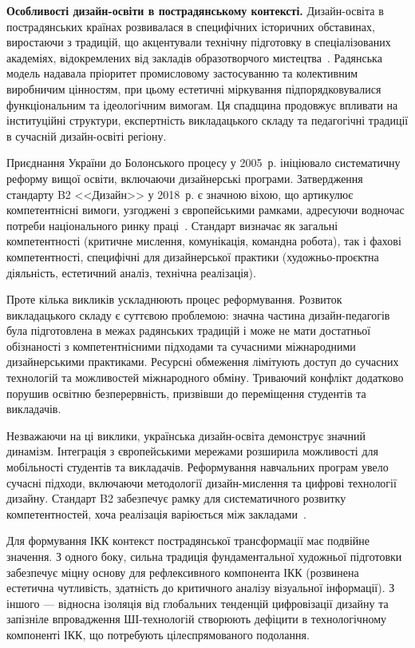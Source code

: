 \textbf{Особливості дизайн-освіти в пострадянському контексті.} Дизайн-освіта в пострадянських країнах розвивалася в специфічних історичних обставинах, виростаючи з традицій, що акцентували технічну підготовку в спеціалізованих академіях, відокремлених від закладів образотворчого мистецтва~\cite{Fursa2014}. Радянська модель надавала пріоритет промисловому застосуванню та колективним виробничим цінностям, при цьому естетичні міркування підпорядковувалися функціональним та ідеологічним вимогам. Ця спадщина продовжує впливати на інституційні структури, експертність викладацького складу та педагогічні традиції в сучасній дизайн-освіті регіону.

Приєднання України до Болонського процесу у 2005~р. ініціювало систематичну реформу вищої освіти, включаючи дизайнерські програми. Затвердження стандарту B2 <<Дизайн>> у 2018~р. є значною віхою, що артикулює компетентнісні вимоги, узгоджені з європейськими рамками, адресуючи водночас потреби національного ринку праці~\cite{MON2018}. Стандарт визначає як загальні компетентності (критичне мислення, комунікація, командна робота), так і фахові компетентності, специфічні для дизайнерської практики (художньо-проєктна діяльність, естетичний аналіз, технічна реалізація).

Проте кілька викликів ускладнюють процес реформування. Розвиток викладацького складу є суттєвою проблемою: значна частина дизайн-педагогів була підготовлена в межах радянських традицій і може не мати достатньої обізнаності з компетентнісними підходами та сучасними міжнародними дизайнерськими практиками. Ресурсні обмеження лімітують доступ до сучасних технологій та можливостей міжнародного обміну. Триваючий конфлікт додатково порушив освітню безперервність, призвівши до переміщення студентів та викладачів.

Незважаючи на ці виклики, українська дизайн-освіта демонструє значний динамізм. Інтеграція з європейськими мережами розширила можливості для мобільності студентів та викладачів. Реформування навчальних програм увело сучасні підходи, включаючи методології дизайн-мислення та цифрові технології дизайну. Стандарт B2 забезпечує рамку для систематичного розвитку компетентностей, хоча реалізація варіюється між закладами~\cite{Musiienko2025DesignEducation}.

Для формування ІКК контекст пострадянської трансформації має подвійне значення. З одного боку, сильна традиція фундаментальної художньої підготовки забезпечує міцну основу для рефлексивного компонента ІКК (розвинена естетична чутливість, здатність до критичного аналізу візуальної інформації). З іншого --- відносна ізоляція від глобальних тенденцій цифровізації дизайну та запізніле впровадження ШІ-технологій створюють дефіцити в технологічному компоненті ІКК, що потребують цілеспрямованого подолання.

